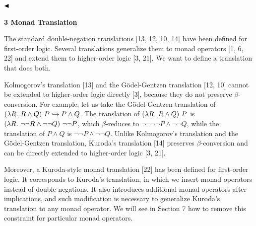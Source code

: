 \documentclass[10pt,a4paper]{article}
\begin{document}
 
  
$\hfill\blacktriangleleft$\par
 
 
 
 


 
\par\medskip\noindent\textbf{3 Monad Translation}\par
 
 
The standard double-negation translations [13, 12, 10, 14] have been defined for first-order logic. Several translations generalize them to monad operators [1, 6, 22] and extend them to higher-order logic [3, 21]. We want to define a translation that does both.\par
 
 
 
Kolmogorov’s translation [13] and the Gödel-Gentzen translation [12, 10] cannot be extended to higher-order logic directly [3], because they do not preserve $\beta$-conversion. For example, let us take the Gödel-Gentzen translation of $(\lambda R.\leavevmode\nobreak\ R\mathbin{\wedge}Q)\leavevmode\nobreak\ P\hookrightarrow P\mathbin{\wedge}Q$. The translation of $(\lambda R.\leavevmode\nobreak\ R\mathbin{\wedge}Q)\leavevmode\nobreak\ P$ is $(\lambda R.\leavevmode\nobreak\ \neg\neg R\mathbin{\wedge}\neg\neg Q)\leavevmode\nobreak\ \neg\neg P$, which $\beta$-reduces to $\neg\neg\neg\neg P\mathbin{\wedge}\neg\neg Q$, while the translation of $P\mathbin{\wedge}Q$ is $\neg\neg P\mathbin{\wedge}\neg\neg Q$. Unlike Kolmogorov’s translation and the Gödel-Gentzen translation, Kuroda’s translation [14] preserves $\beta$-conversion and can be directly extended to higher-order logic [3, 21].\par
 
 
 
Moreover, a Kuroda-style monad translation [22] has been defined for first-order logic. It corresponds to Kuroda’s translation, in which we insert monad operators instead of double negations. It also introduces additional monad operators after implications, and such modification is necessary to generalize Kuroda’s translation to any monad operator. We will see in Section 7 how to remove this constraint for particular monad operators.\par
 
\end{document}
